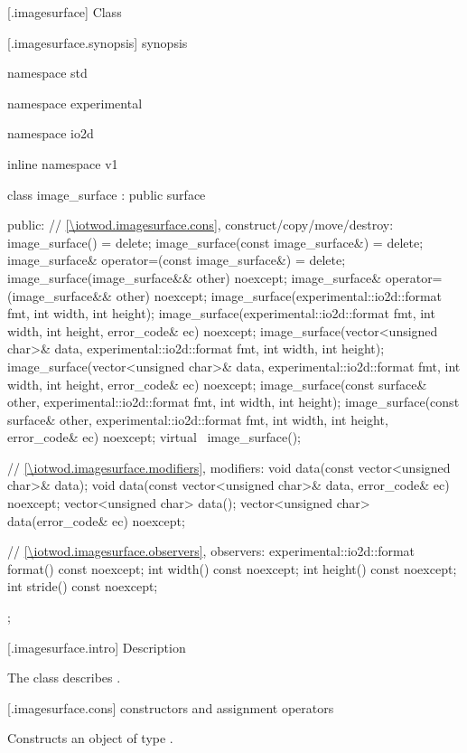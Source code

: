  [\iotwod.imagesurface] {Class }

 [\iotwod.imagesurface.synopsis] { synopsis}

\begin{codeblock}
namespace std { namespace experimental { namespace io2d { inline namespace v1 {
  class image_surface : public surface {
  public:
    // \ref{\iotwod.imagesurface.cons}, construct/copy/move/destroy:
    image_surface() = delete;
    image_surface(const image_surface&) = delete;
    image_surface& operator=(const image_surface&) = delete;
    image_surface(image_surface&& other) noexcept;
    image_surface& operator=(image_surface&& other) noexcept;
    image_surface(experimental::io2d::format fmt, int width, int height);
    image_surface(experimental::io2d::format fmt, int width, int height, 
      error_code& ec) noexcept;
    image_surface(vector<unsigned char>& data, experimental::io2d::format fmt,
      int width, int height);
    image_surface(vector<unsigned char>& data, experimental::io2d::format fmt,
      int width, int height, error_code& ec) noexcept;
    image_surface(const surface& other, experimental::io2d::format fmt, int width,
      int height);
    image_surface(const surface& other, experimental::io2d::format fmt, int width,
      int height, error_code& ec) noexcept;
    virtual ~image_surface();
    
    // \ref{\iotwod.imagesurface.modifiers}, modifiers:
    void data(const vector<unsigned char>& data);
    void data(const vector<unsigned char>& data, error_code& ec) noexcept;
    vector<unsigned char> data();
    vector<unsigned char> data(error_code& ec) noexcept;
    
    // \ref{\iotwod.imagesurface.observers}, observers:
    experimental::io2d::format format() const noexcept;
    int width() const noexcept;
    int height() const noexcept;
    int stride() const noexcept;
  };
} } } }
\end{codeblock}

 [\iotwod.imagesurface.intro] { Description}

\pnum
{}
The class  describes .

 [\iotwod.imagesurface.cons] { constructors and assignment operators}

\begin{itemdecl}
\end{itemdecl}
\begin{itemdescr}
	\pnum
	\effects
	Constructs an object of type .
	
	\pnum
	\postconditions
	
\end{itemdescr}

